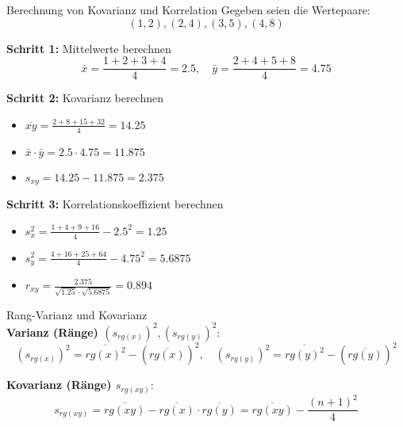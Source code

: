 \begin{example2}{Berechnung von Kovarianz und Korrelation}
Gegeben seien die Wertepaare:
$$(1,2), (2,4), (3,5), (4,8)$$

\textbf{Schritt 1:} Mittelwerte berechnen
$$\bar{x} = \frac{1+2+3+4}{4} = 2.5, \quad \bar{y} = \frac{2+4+5+8}{4} = 4.75$$

\textbf{Schritt 2:} Kovarianz berechnen
\begin{itemize}
    \item $\overline{xy} = \frac{2+8+15+32}{4} = 14.25$
    \item $\bar{x} \cdot \bar{y} = 2.5 \cdot 4.75 = 11.875$
    \item $s_{xy} = 14.25 - 11.875 = 2.375$
\end{itemize}

\textbf{Schritt 3:} Korrelationskoeffizient berechnen
\begin{itemize}
    \item $s_x^2 = \frac{1+4+9+16}{4} - 2.5^2 = 1.25$
    \item $s_y^2 = \frac{4+16+25+64}{4} - 4.75^2 = 5.6875$
    \item $r_{xy} = \frac{2.375}{\sqrt{1.25} \cdot \sqrt{5.6875}} = 0.894$
\end{itemize}
\end{example2}



\begin{definition}{Rang-Varianz und Kovarianz}\\
\textbf{Varianz (Ränge) $(s_{rg(x)})^2, (s_{rg(y)})^2$}:
$$(s_{rg(x)})^2 = \overline{rg(x)^2} - (\overline{rg(x)})^2, \quad (s_{rg(y)})^2 = \overline{rg(y)^2} - (\overline{rg(y)})^2$$

\textbf{Kovarianz (Ränge) $s_{rg(xy)}$}:
$$s_{rg(xy)} = \overline{rg(xy)} - \overline{rg(x)} \cdot \overline{rg(y)} = \overline{rg(xy)} - \frac{(n+1)^2}{4}$$
\end{definition}

